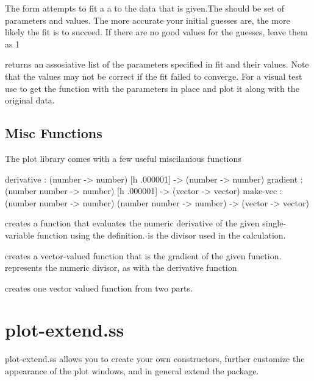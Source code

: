 \documentclass{article}
\begin{document}
{\begin{schemedisplay}
       
\end{schemedisplay}



The  form attempts to fit a a  to the data that is given.The should be set of parameters and values. The more accurate  your initial guesses are, the more likely the fit is to succeed. If there are no good values for the guesses, leave them as 1


 returns an assosiative list of the parameters specified  in fit
 and their values. Note that the values may not be correct if the fit failed to converge. 
For a visual test use  to get the function with the parameters 
in place and plot it along with the original data.

\subsection{Misc Functions}


The plot library comes with a few useful miscilanious functions


\begin{schemedisplay}

derivative      : (number -> number) [h .000001] -> (number -> number)   
gradient : (number number -> number) [h .000001] -> (vector -> vector)
make-vec : (number number -> number) (number number -> number) -> (vector -> vector) 
\end{schemedisplay}

 creates a function that evaluates the numeric derivative of the given  single-variable function using the definition.  is the divisor used in the calculation.


 creates a vector-valued function that is the gradient of the given function. represents the numeric divisor, as with the derivative function


 creates one vector valued function from two parts.

\pagebreak


\label{plot-extend.ss}
\section{plot-extend.ss}



plot-extend.ss allows you to create your own constructors, further customize the appearance of the plot windows,
     and in general extend the package.


}
\end{document}
